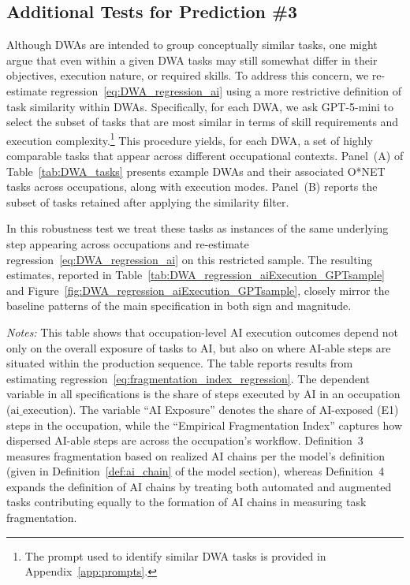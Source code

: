 \subsection{Additional Tests for Prediction \#3}
\label{app:additional_robustness_pred3}
Although DWAs are intended to group conceptually similar tasks, one might argue that even within a given DWA tasks may still somewhat differ in their objectives, execution nature, or required skills.  
To address this concern, we re-estimate regression~\eqref{eq:DWA_regression_ai} using a more restrictive definition of task similarity within DWAs. 
Specifically, for each DWA, we ask GPT-5-mini to select the subset of tasks that are most similar in terms of skill requirements and execution complexity.\footnote{The prompt used to identify similar DWA tasks is provided in Appendix~\ref{app:prompts}.}  
This procedure yields, for each DWA, a set of highly comparable tasks that appear across different occupational contexts.
Panel~(A) of Table~\ref{tab:DWA_tasks} presents example DWAs and their associated O*NET tasks across occupations, along with execution modes.  
Panel~(B) reports the subset of tasks retained after applying the similarity filter.

In this robustness test we treat these tasks as instances of the same underlying step appearing across occupations and re-estimate regression~\eqref{eq:DWA_regression_ai} on this restricted sample.  
The resulting estimates, reported in Table~\ref{tab:DWA_regression_aiExecution_GPTsample} and  Figure~\ref{fig:DWA_regression_aiExecution_GPTsample}, closely mirror the baseline patterns of the main specification in both sign and magnitude.  



\newpage
\begin{table}[h!]
    \caption{Role of AI-able Task Fragmentation in Determining AI Execution Outcomes (Using Execution-Based Empirical Fragmentation Measures)}
    \label{tab:fragmentation_index_regression_execution}
    \begin{center}
    
    \end{center}
    \raggedright \footnotesize{\emph{Notes:}} This table shows that occupation-level AI execution outcomes depend not only on the overall exposure of tasks to AI, but also on where AI-able steps are situated within the production sequence.
    The table reports results from estimating regression~\eqref{eq:fragmentation_index_regression}.
    The dependent variable in all specifications is the share of steps executed by AI in an occupation ($\text{ai\_execution}$).
    The variable ``AI Exposure'' denotes the share of AI-exposed (E1) steps in the occupation, while the ``Empirical Fragmentation Index'' captures how dispersed AI-able steps are across the occupation’s workflow.
    Definition~3 measures fragmentation based on realized AI chains per the model's definition (given in Definition~\ref{def:ai_chain} of the model section), whereas Definition~4 expands the definition of AI chains by treating both automated and augmented tasks contributing equally to the formation of AI chains in measuring task fragmentation.
\end{table}



